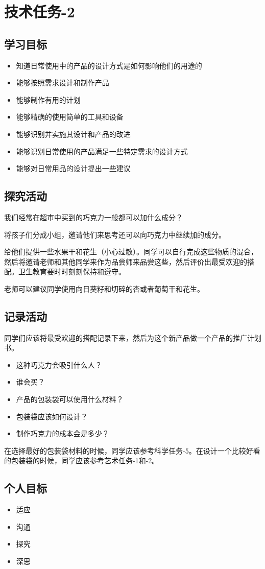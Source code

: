 \chapter{技术任务-2}



\section{学习目标}
  \begin{itemize}
    \item 知道日常使用中的产品的设计方式是如何影响他们的用途的
    \item 能够按照需求设计和制作产品
    \item 能够制作有用的计划
    \item 能够精确的使用简单的工具和设备
    \item 能够识别并实施其设计和产品的改进
    \item 能够识别日常使用的产品满足一些特定需求的设计方式
    \item 能够对日常用品的设计提出一些建议
  \end{itemize}  
   


\section{探究活动}
    我们经常在超市中买到的巧克力一般都可以加什么成分？\par
    将孩子们分成小组，邀请他们来思考还可以向巧克力中继续加的成分。\par
    给他们提供一些水果干和花生（小心过敏）。同学可以自行完成这些物质的混合，然后将邀请老师和其他同学来作为品尝师来品尝这些，然后评价出最受欢迎的搭配。卫生教育要时时刻刻保持和遵守。\par
    老师可以建议同学使用向日葵籽和切碎的杏或者葡萄干和花生。\par
    

\section{记录活动}
  同学们应该将最受欢迎的搭配记录下来，然后为这个新产品做一个产品的推广计划书。\par
  \begin{itemize}
     \item 这种巧克力会吸引什么人？
     \item 谁会买？
     \item 产品的包装袋可以使用什么材料？
     \item 包装袋应该如何设计？
     \item 制作巧克力的成本会是多少？
  \end{itemize}  
  在选择最好的包装袋材料的时候，同学应该参考科学任务-5。在设计一个比较好看的包装袋的时候，同学应该参考艺术任务-1和-2。\par
  

\section{个人目标}
\begin{itemize}
  \item 适应
  \item 沟通
  \item 探究
  \item 深思
\end{itemize}
